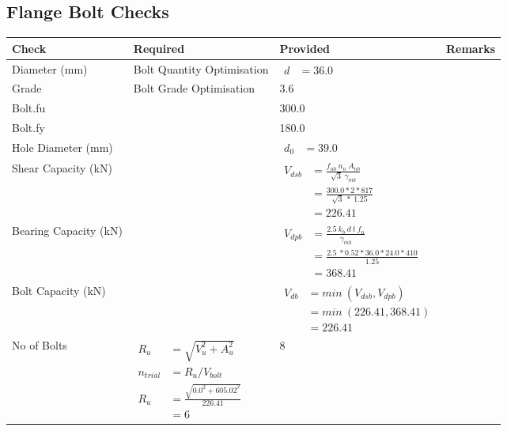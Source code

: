 \documentclass{article}%
\begin{document}
\subsection{Flange Bolt Checks}%
\label{subsec:FlangeBoltChecks}%
\renewcommand{\arraystretch}{1.2}%
\begin{longtable}{|p{4cm}|p{5cm}|p{5.5cm}|p{1.5cm}|}%
\hline%
\rowcolor{OsdagGreen}%
Check&Required&Provided&Remarks\\%
\hline%
\endhead%
\hline%
Diameter (mm)&Bolt Quantity Optimisation&$\begin{aligned} d &=36.0\end{aligned}$&\\%
\hline%
Grade&Bolt Grade Optimisation&3.6&\\%
\hline%
Bolt.fu&&300.0&\\%
\hline%
Bolt.fy&&180.0&\\%
\hline%
Hole Diameter (mm)& &$\begin{aligned} d_0 &=39.0\end{aligned}$&\\%
\hline%
Shear Capacity (kN)&&$\begin{aligned}V_{dsb} &= \frac{f_{ub} ~n_n~ A_{nb}}{\sqrt{3} ~\gamma_{mb}}\\ &= \frac{300.0*2*817}{\sqrt{3}~*~1.25}\\ &= 226.41\end{aligned}$&\\%
\hline%
Bearing Capacity (kN)&&$\begin{aligned}V_{dpb} &= \frac{2.5~ k_b~ d~ t~ f_u}{\gamma_{mb}}\\ &= \frac{2.5~*0.52*36.0*24.0*410}{1.25}\\ &=368.41\end{aligned}$&\\%
\hline%
Bolt Capacity (kN)&&$\begin{aligned}V_{db} &= min~ (V_{dsb}, V_{dpb})\\ &= min~ (226.41,368.41)\\ &=226.41\end{aligned}$&\\%
\hline%
No of Bolts&$\begin{aligned}R_{u} &= \sqrt{V_u^2+A_u^2}\\ n_{trial} &= R_u/ V_{bolt}\\ R_{u} &= \frac{\sqrt{0.0^2+605.02^2}}{226.41}\\ &=6\end{aligned}$&8&\\%
\hline%

\end{longtable}
\end{document}
